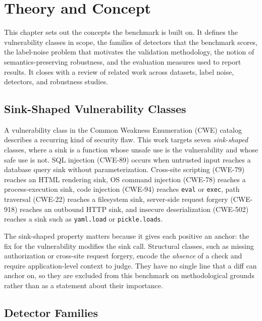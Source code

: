\chapter{Theory and Concept}
\label{ch:theory}

This chapter sets out the concepts the benchmark is built on. It defines the
vulnerability classes in scope, the families of detectors that the benchmark
scores, the label-noise problem that motivates the validation methodology, the
notion of semantics-preserving robustness, and the evaluation measures used to
report results. It closes with a review of related work across datasets, label
noise, detectors, and robustness studies.


\section{Sink-Shaped Vulnerability Classes}

A vulnerability class in the Common Weakness Enumeration (CWE) catalog describes
a recurring kind of security flaw. This work targets seven \emph{sink-shaped}
classes, where a sink is a function whose unsafe use is the vulnerability and
whose safe use is not. SQL injection (CWE-89) occurs when untrusted input
reaches a database query sink without parameterization. Cross-site scripting
(CWE-79) reaches an HTML rendering sink, OS command injection (CWE-78) reaches a
process-execution sink, code injection (CWE-94) reaches \texttt{eval} or
\texttt{exec}, path traversal (CWE-22) reaches a filesystem sink, server-side
request forgery (CWE-918) reaches an outbound HTTP sink, and insecure
deserialization (CWE-502) reaches a sink such as \texttt{yaml.load} or
\texttt{pickle.loads}.

The sink-shaped property matters because it gives each positive an anchor: the
fix for the vulnerability modifies the sink call. Structural classes, such as
missing authorization or cross-site request forgery, encode the \emph{absence}
of a check and require application-level context to judge. They have no single
line that a diff can anchor on, so they are excluded from this benchmark on
methodological grounds rather than as a statement about their importance.

\section{Detector Families}

